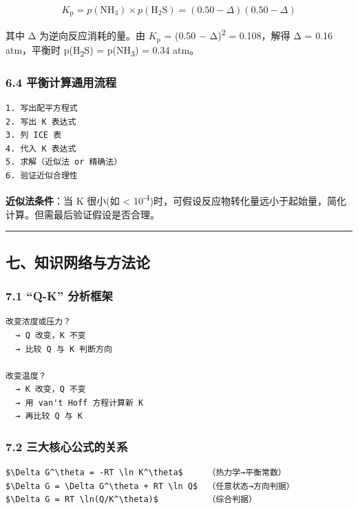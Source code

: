 \[
K_{\mathrm p} = p(\mathrm{NH_3}) \times p(\mathrm{H_2S}) = (0.50 - \Delta)(0.50 - \Delta)
\]

其中 Δ 为逆向反应消耗的量。由 \(K_{\mathrm p}\) = (0.50 − Δ)\textsuperscript{2} = 0.108，解得 Δ = 0.16 atm，平衡时 p(H\textsubscript{2}S) = p(NH\textsubscript{3}) = 0.34 atm。

\subsubsection{6.4 平衡计算通用流程}\label{ux5e73ux8861ux8ba1ux7b97ux901aux7528ux6d41ux7a0b}

\begin{verbatim}
1. 写出配平方程式
2. 写出 K 表达式
3. 列 ICE 表
4. 代入 K 表达式
5. 求解（近似法 or 精确法）
6. 验证近似合理性
\end{verbatim}

\textbf{近似法条件}：当 K 很小(如 \textless{} 10\textsuperscript{-4})时，可假设反应物转化量远小于起始量，简化计算。但需最后验证假设是否合理。

\begin{center}\rule{0.5\linewidth}{0.5pt}\end{center}

\subsection{七、知识网络与方法论}\label{ux4e03ux77e5ux8bc6ux7f51ux7edcux4e0eux65b9ux6cd5ux8bba}

\subsubsection{7.1 ``Q-K'' 分析框架}\label{q-k-ux5206ux6790ux6846ux67b6}

\begin{verbatim}
改变浓度或压力？
  → Q 改变，K 不变
  → 比较 Q 与 K 判断方向

改变温度？
  → K 改变，Q 不变
  → 用 van't Hoff 方程计算新 K
  → 再比较 Q 与 K
\end{verbatim}

\subsubsection{7.2 三大核心公式的关系}\label{ux4e09ux5927ux6838ux5fc3ux516cux5f0fux7684ux5173ux7cfb}

\begin{verbatim}
$\Delta G^\theta = -RT \ln K^\theta$     （热力学→平衡常数）
$\Delta G = \Delta G^\theta + RT \ln Q$  （任意状态→方向判据）
$\Delta G = RT \ln(Q/K^\theta)$          （综合判据）
\end{verbatim}


